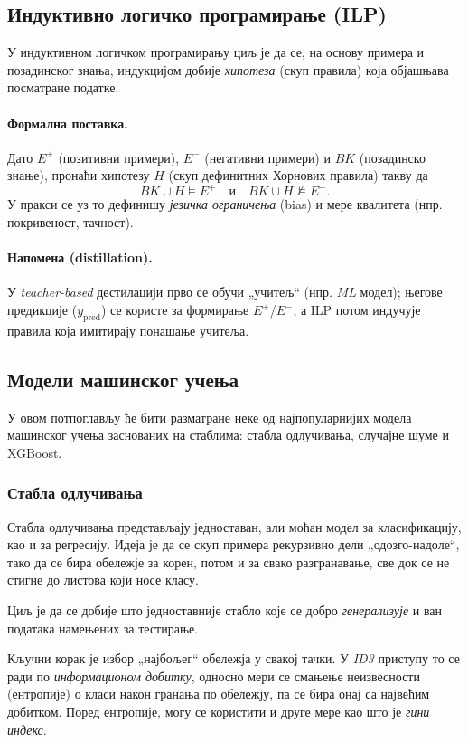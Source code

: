 \subsection{Индуктивно логичко програмирање (ILP)}
У индуктивном логичком програмирању циљ је да се, на основу примера и позадинског знања, индукцијом добије \emph{хипотеза} (скуп правила) која објашњава посматране податке.

\paragraph{Формална поставка.}
Дато $E^+$ (позитивни примери), $E^-$ (негативни примери) и $BK$ (позадинско знање), пронаћи хипотезу $H$ (скуп дефинитних Хорнових правила) такву да
\[
BK \cup H \models E^+ 
\quad\text{и}\quad
BK \cup H \not\models E^-.
\]
У пракси се уз то дефинишу \emph{језичка ограничења} (bias) и мере квалитета (нпр. покривеност, тачност).

\paragraph{Напомена (distillation).}
У \emph{teacher-based} дестилацији прво се обучи „учитељ“ (нпр. \emph{ML} модел); његове предикције ($y_{\text{pred}}$) се користе за формирање $E^+$/$E^-$, а ILP потом индучује правила која имитирају понашање учитеља.


\subsection{Модели машинског учења}

У овом потпоглављу ће бити разматране неке од најпопуларнијих модела машинског учења заснованих на стаблима: стабла одлучивања, случајне шуме и XGBoost.

\subsubsection{Стабла одлучивања}

Стабла одлучивања представљају једноставан, али моћан модел за класификацију, као и за регресију. Идеја је да се скуп примера рекурзивно дели „одозго-надоле“, тако да се бира обележје за корен, потом и за свако разгранавање, све док се не стигне до листова који носе класу.

Циљ је да се добије што једноставније стабло које се добро \textit{генерализује} и ван података намењених за тестирање.

Кључни корак је избор „најбољег“ обележја у свакој тачки. У \textit{ID3} приступу то се ради по \textit{информационом добитку}, односно мери се смањење неизвесности (ентропије) о класи након гранања по обележју, па се бира онај са највећим добитком. Поред ентропије, могу се користити и друге мере као што је \textit{гини индекс}.

